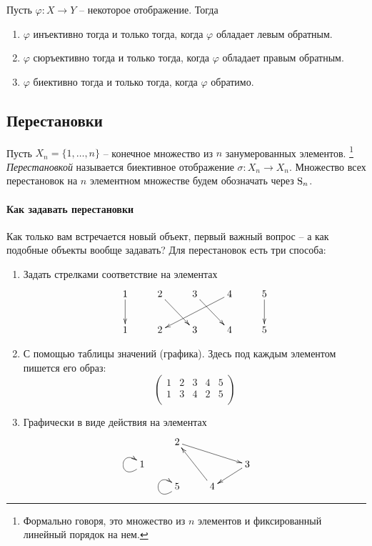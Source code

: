 \begin{claim*}
Пусть $\varphi\colon X\to Y$ -- некоторое отображение.
Тогда
\begin{enumerate}
\item $\varphi$ инъективно тогда и только тогда, когда $\varphi$ обладает левым обратным.

\item $\varphi$ сюръективно тогда и только тогда, когда $\varphi$ обладает правым обратным.

\item $\varphi$ биективно тогда и только тогда, когда $\varphi$ обратимо.
\end{enumerate}
\end{claim*}


\subsection{Перестановки}

Пусть $X_n = \{1,\ldots,n\}$ -- конечное множество из $n$ занумерованных элементов.%
\footnote{Формально говоря, это множество из $n$ элементов и фиксированный линейный порядок на нем.}
{\it Перестановкой} называется биективное отображение $\sigma\colon X_n\to X_n$.
Множество всех перестановок на $n$ элементном множестве будем обозначать через $\operatorname{S}_{n}$.

\paragraph{Как задавать перестановки}

Как только вам встречается новый объект, первый важный вопрос -- а как подобные объекты вообще задавать?
Для перестановок есть три способа:
\begin{enumerate}
\item Задать стрелками соответствие на элементах
\[
\xymatrix{
	{1}\ar[d]&{2}\ar[dr]&{3}\ar[dr]&{4}\ar[dll]&{5}\ar[d]\\
	{1}&{2}&{3}&{4}&{5}
}
\]

\item С помощью таблицы значений (графика).
Здесь под каждым элементом пишется его образ:
\[
\begin{pmatrix}
{1}&{2}&{3}&{4}&{5}\\
{1}&{3}&{4}&{2}&{5}\\
\end{pmatrix}
\]

\item Графически в виде действия на элементах
\[
\xymatrix@R=10pt{
	{}&{2}\ar[rrd]&{}&{}\\
	{1}\ar@(dl,ul)&{}&{}&{3}\ar[dl]\\
	{}&{5}\ar@(dl,ul)&{4}\ar[luu]&{}
}
\]
\end{enumerate}

